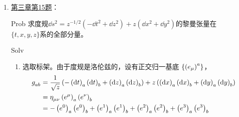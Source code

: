 \begin{xiti}
\begin{jie}
\begin{enumerate}
\begin{yl}{Solv}
\begin{enumerate}[leftmargin=2em]
					\begin{align*}
					\tensor{R}{_a_b_c^d} &= \tensor{R}{_{(\mu)}_{(\nu)}_{(\sigma)}^{(\rho)}} \tensor{\left(e^\mu\right)}{_a} \tensor{\left(e^\nu\right)}{_b} \tensor{\left(e^\sigma\right)}{_c} \tensor{\left(e_\rho\right)}{^d}\\
					&= \Omega^3 \tensor{R}{_{(\mu)}_{(\nu)}_{(\sigma)}^{(\rho)}} \tensor{\left(\dd{x^\mu}\right)}{_a} \tensor{\left(\dd{x^\nu}\right)}{_b} \tensor{\left(\dd{x^\sigma}\right)}{_c} \tensor{\left(\pdv{x^\rho}\right)}{^d}
					\end{align*}
					故应有
					\begin{displaymath}
					\tensor{R}{_\mu_\nu_\sigma^\rho} = \Omega^3 \tensor{R}{_{(\mu)}_{(\nu)}_{(\sigma)}^{(\rho)}}
					\end{displaymath}
					与第三章求得的
					\[ \tensor{R}{_t_x_x^t}= -\tensor{R}{_x_t_x^t}=\tensor{R}{_t_x_t^x}= -\tensor{R}{_x_t_t^x}= \frac{\Omega \left( \Omega^{\prime\prime}- \ddot{\Omega} \right)+ \dot{\Omega}^2 - {\Omega^\prime}^2 }{\Omega^2} \]
					对比，知两种方法是一致的。
				\end{enumerate}
			\end{yl}
		    \item \hyperlink{3.15}{第三章第15题}：
		    \begin{yl}{Prob}
		    	求度规$\dd{s}^2=z^{-1/2} \left(-\dd{t}^2+\dd{z}^2\right)+ z\left(\dd{x}^2+\dd{y}^2\right)$的黎曼张量在$\{t,x,y,z\}$系的全部分量。
		    \end{yl}
	        \begin{yl}{Solv}
	        	\begin{enumerate}[leftmargin=2em]
	        		\item 选取标架。由于度规是洛伦兹的，设有正交归一基底 $\{ \tensor{\left(e_\mu\right)}{^a} \} $，
	        		\begin{align*}
	        		\tensor{g}{_a_b} &= \frac{1}{\sqrt{z}} \left( - \tensor{\left(\dd{t}\right)}{_a} \tensor{\left(\dd{t}\right)}{_b} + \tensor{\left(\dd{z}\right)}{_a} \tensor{\left(\dd{z}\right)}{_b} \right) + z \left( \tensor{\left(\dd{x}\right)}{_a} \tensor{\left(\dd{x}\right)}{_b} + \tensor{\left(\dd{y}\right)}{_a} \tensor{\left(\dd{y}\right)}{_b} \right) \\
	        		&= \tensor{\eta}{_\mu_\nu} \tensor{\left(e^\mu\right)}{_a} \tensor{\left(e^\nu\right)}{_b}\\
	        		&= - \tensor{\left(e^0\right)}{_a} \tensor{\left(e^0\right)}{_b} + \tensor{\left(e^1\right)}{_a} \tensor{\left(e^1\right)}{_b} + \tensor{\left(e^2\right)}{_a} \tensor{\left(e^2\right)}{_b} + \tensor{\left(e^3\right)}{_a} \tensor{\left(e^3\right)}{_b}

\end{align*}
\end{enumerate}
\end{yl}
\end{enumerate}
\end{jie}
\end{xiti}
